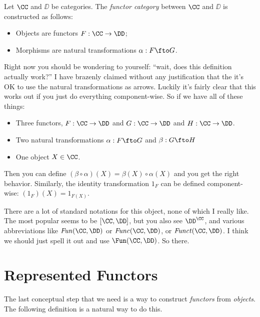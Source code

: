 \begin{defn}
 Let $\CC$ and $\DD$ be categories. The \emph{functor category} between $\CC$ and $\DD$ is
 constructed as follows:
 \begin{itemize}
  \item Objects are functors $F: \CC \to \DD$;
  \item Morphisms are natural transformations $\alpha:F\fto G$.
 \end{itemize}
\end{defn}
\noindent
Right now you should be wondering to yourself: ``wait, does this definition actually
work?'' I have brazenly claimed without any justification that the it's OK to use the natural
transformations as arrows. Luckily it's fairly clear that this works out if you just
do everything component-wise. So if we have all of these things: 
\begin{itemize}
\item Three functors, $F: \CC \to \DD$ and $G: \CC \to \DD$ and $H:\CC \to \DD$.

\item Two natural transformations $\alpha: F \fto G$ and $\beta: G \fto H$

\item One object $X \in \CC$.
\end{itemize}
\noindent
Then you can define $(\beta \circ \alpha)(X) = \beta(X) \circ \alpha(X)$ and you get the
right behavior. Similarly, the identity transformation $1_F$ can be defined
component-wise: $(1_F)(X) = 1_{F(X)}$.

There are a lot of standard notations for this object, none of which I really like. The
most popular seems to be $[\CC, \DD]$, but you also see $\DD^{\CC}$, and various  
abbreviations like $\mathop{\mathit{Fun}}(\CC,\DD)$ or $\mathop{\mathit{Func}}(\CC,\DD)$,
or $\mathop{\mathit{Funct}}(\CC,\DD)$. I think we should just spell it out and use
$\Fun(\CC,\DD)$. So there.

\section{Represented Functors}

The last conceptual step that we need is a way to construct {\it functors} from {\it objects}. The following
definition is a natural way to do this.

